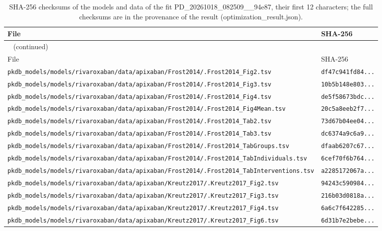 \begin{longtable}{ll}
\caption{SHA-256 checksums of the models and data of the fit PD\_20261018\_082509\_\_94e87, their first 12 characters; the full checksums are in the provenance of the result (optimization\_result.json).}\label{tab:checksums:PD_20261018_082509__94e87} \\
\toprule
File & SHA-256 \\
\midrule
\endfirsthead
\multicolumn{2}{l}{\small\tablename~\thetable{} (continued)} \\
\toprule
File & SHA-256 \\
\midrule
\endhead
\bottomrule
\endlastfoot
\texttt{pkdb\_models/models/rivaroxaban/data/apixaban/Frost2014/.Frost2014\_Fig2.tsv} & \texttt{df47c941fd84...} \\
\texttt{pkdb\_models/models/rivaroxaban/data/apixaban/Frost2014/.Frost2014\_Fig3.tsv} & \texttt{10b5b148e803...} \\
\texttt{pkdb\_models/models/rivaroxaban/data/apixaban/Frost2014/.Frost2014\_Fig4.tsv} & \texttt{de5f58673bdc...} \\
\texttt{pkdb\_models/models/rivaroxaban/data/apixaban/Frost2014/.Frost2014\_Fig4Mean.tsv} & \texttt{20c5a8eeb2f7...} \\
\texttt{pkdb\_models/models/rivaroxaban/data/apixaban/Frost2014/.Frost2014\_Tab2.tsv} & \texttt{73d67b04ee04...} \\
\texttt{pkdb\_models/models/rivaroxaban/data/apixaban/Frost2014/.Frost2014\_Tab3.tsv} & \texttt{dc6374a9c6a9...} \\
\texttt{pkdb\_models/models/rivaroxaban/data/apixaban/Frost2014/.Frost2014\_TabGroups.tsv} & \texttt{dfaab6207c67...} \\
\texttt{pkdb\_models/models/rivaroxaban/data/apixaban/Frost2014/.Frost2014\_TabIndividuals.tsv} & \texttt{6cef70f6b764...} \\
\texttt{pkdb\_models/models/rivaroxaban/data/apixaban/Frost2014/.Frost2014\_TabInterventions.tsv} & \texttt{a2285172067a...} \\
\texttt{pkdb\_models/models/rivaroxaban/data/apixaban/Kreutz2017/.Kreutz2017\_Fig2.tsv} & \texttt{94243c590984...} \\
\texttt{pkdb\_models/models/rivaroxaban/data/apixaban/Kreutz2017/.Kreutz2017\_Fig3.tsv} & \texttt{216b03d0818a...} \\
\texttt{pkdb\_models/models/rivaroxaban/data/apixaban/Kreutz2017/.Kreutz2017\_Fig4.tsv} & \texttt{6a6c7f642285...} \\
\texttt{pkdb\_models/models/rivaroxaban/data/apixaban/Kreutz2017/.Kreutz2017\_Fig6.tsv} & \texttt{6d31b7e2bebe...} \\

\end{longtable}
